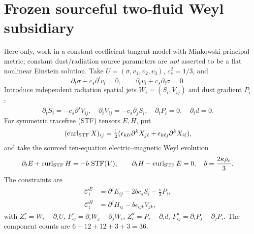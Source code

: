 \documentclass[11pt,a4paper]{article}
\newcommand{\cC}{\mathcal C}
\newcommand{\STF}{\operatorname{STF}}
\newcommand{\curl}{\operatorname{curl}}
\newcommand{\kap}{\kappa}
\begin{document}
\section{Frozen sourceful two-fluid Weyl subsidiary}
Here only, work in a constant-coefficient tangent model with Minkowski principal metric; constant dust/radiation source parameters are \emph{not} asserted to be a flat nonlinear Einstein solution. Take $U=(\sigma,v_1,v_2,v_3)$, $c_s^2=1/3$, and
\begin{equation}
\partial_t\sigma+c_s\partial^iv_i=0,\qquad
\partial_tv_i+c_s\partial_i\sigma=0.\label{eq:acoustic}
\end{equation}
Introduce independent radiation spatial jets $W_i=(S_i,V_{ij})$ and dust gradient $P_i$:
\begin{equation}\partial_tS_i=-c_s\partial^jV_{ij},\quad
\partial_tV_{ij}=-c_s\partial_jS_i,\quad \partial_t P_i=0,\quad\partial_t d=0.\label{eq:jets}\end{equation}
For symmetric tracefree (STF) tensors $E,H$, put
\[(\curl_{\rm STF}X)_{ij}=\tfrac12(\epsilon_{k\ell i}\partial^kX_{j\ell}+\epsilon_{k\ell j}\partial^k X_{i\ell}),\]
and take the sourced ten-equation electric--magnetic Weyl evolution
\begin{equation}
\partial_tE+\curl_{\rm STF}H=-b\,\STF(V),\qquad
\partial_tH-\curl_{\rm STF}E=0,\quad b=\frac{2\kap\bar\rho_r}{3}.\label{eq:weyl}
\end{equation}
The constraints are
\begin{align}
\cC_i^E&=\partial^jE_{ij}-2bc_sS_i-\frac\kap3P_i,\\
\cC_i^H&=\partial^jH_{ij}-b\epsilon_{ijk}V_{jk},\label{eq:constraints}\end{align}
with $Z_i^r=W_i-\partial_iU$, $F_{ij}^r=\partial_iW_j-\partial_jW_i$, $Z_i^d=P_i-\partial_id$, $F_{ij}^d=\partial_iP_j-\partial_jP_i$. The component counts are $6+12+12+3+3=36$.
\end{document}
